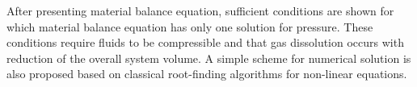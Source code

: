\documentclass[final,authoryear,5p,times,twocolumn,10pt]{elsarticle}
\begin{document}

After presenting material balance equation, sufficient conditions are shown for which material balance equation has only one solution for pressure. These conditions require fluids to be compressible and that gas dissolution occurs with reduction of the overall system volume. A simple scheme for numerical solution is also proposed based on classical root-finding algorithms for non-linear equations.

%
%
%
%
%
%
%
\end{document}
